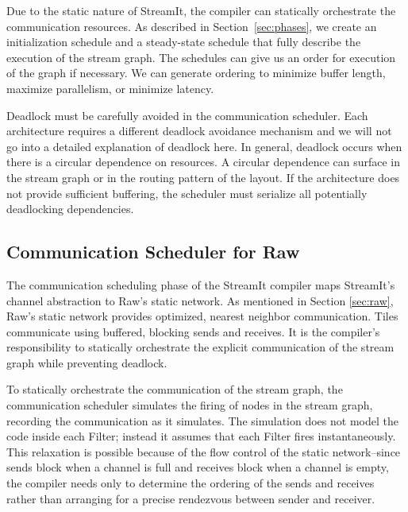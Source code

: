 Due to the static nature of StreamIt, the compiler can statically
orchestrate the communication resources.  As described in
Section~\ref{sec:phases}, we create an initialization schedule and a
steady-state schedule that fully describe the execution of the stream
graph.  The schedules can give us an order for execution of the graph
if necessary.  We can generate ordering to minimize buffer length,
maximize parallelism, or minimize latency.


Deadlock must be carefully avoided in the communication
scheduler. Each architecture requires a different deadlock avoidance
mechanism and we will not go into a detailed explanation of deadlock
here.  In general, deadlock occurs when there is a circular dependence
on resources.  A circular dependence can surface in the stream graph
or in the routing pattern of the layout.  If the architecture does not
provide sufficient buffering, the scheduler must serialize all
potentially deadlocking dependencies.


\subsection{Communication Scheduler for Raw}
\label{sec:rawcommunic}

The communication scheduling phase of the StreamIt compiler maps
StreamIt's channel abstraction to Raw's static network.  As mentioned
in Section \ref{sec:raw}, Raw's static network provides optimized,
nearest neighbor communication.  Tiles communicate using buffered,
blocking sends and receives.  It is the compiler's responsibility to
statically orchestrate the explicit communication of the stream graph
while preventing deadlock.

To statically orchestrate the communication of the stream graph, the
communication scheduler simulates the firing of nodes in the stream
graph, recording the communication as it simulates.  The simulation
does not model the code inside each Filter; instead it assumes that
each Filter fires instantaneously.  This relaxation is possible
because of the flow control of the static network--since sends block
when a channel is full and receives block when a channel is empty, the
compiler needs only to determine the ordering of the sends and
receives rather than arranging for a precise rendezvous between sender
and receiver.

